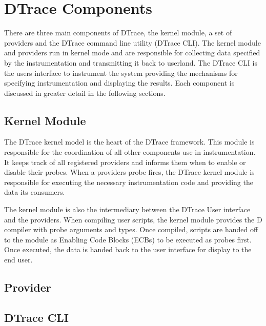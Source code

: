 

\section{DTrace Components}

There are three main components of DTrace, the kernel module, a set of providers and the DTrace command line utility (DTrace CLI). The kernel module and providers run in kernel mode and are responsible for collecting data specified by the instrumentation and transmitting it back to userland. The DTrace CLI is the users interface to instrument the system providing the mechanisms for specifying instrumentation and displaying the results. Each component is discussed in greater detail in the following sections.

\subsection{Kernel Module}

The DTrace kernel model is the heart of the DTrace framework. This module is responsible for the coordination of all other components use in instrumentation. It keeps track of all registered providers and informs them when to enable or disable their probes. When a providers probe fires, the DTrace kernel module is responsible for executing the necessary instrumentation code and providing the data its consumers.

The kernel module is also the intermediary between the DTrace User interface and the providers. When compiling user scripts, the kernel module provides the D compiler with probe arguments and types. Once compiled, scripts are handed off to the module as Enabling Code Blocks (ECBs) to be executed as probes first. Once executed, the data is handed back to the user interface for display to the end user.

\subsection{Provider}



\subsection{DTrace CLI}


